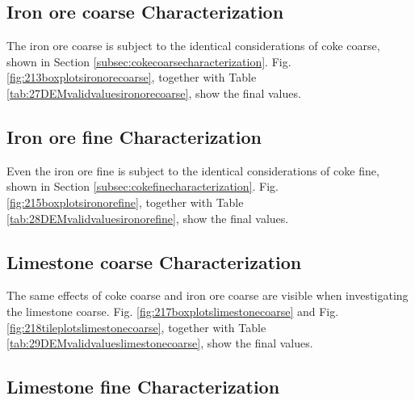 

%


\subsection{Iron ore coarse Characterization}
\label{subsec:ironorecoarsecharacterization}

The iron ore coarse is subject to the identical considerations of coke coarse,
shown in Section \ref{subsec:cokecoarsecharacterization}.
Fig. \ref{fig:213boxplotsironorecoarse}, together with Table
\ref{tab:27DEMvalidvaluesironorecoarse}, show the final values.



%


\subsection{Iron ore fine Characterization}
\label{subsec:ironorefinecharacterization}

Even the iron ore fine is subject to the identical considerations of coke
fine, shown in Section \ref{subsec:cokefinecharacterization}.
Fig. \ref{fig:215boxplotsironorefine}, together with Table
\ref{tab:28DEMvalidvaluesironorefine}, show the final values.



%


\subsection{Limestone coarse Characterization}
\label{subsec:limestonecoarsecharacterization}

The same effects of coke coarse and iron ore coarse are visible when
investigating the limestone coarse.
Fig. \ref{fig:217boxplotslimestonecoarse} and Fig.
\ref{fig:218tileplotslimestonecoarse}, together with Table
\ref{tab:29DEMvalidvalueslimestonecoarse}, show the final values.



%


\subsection{Limestone fine Characterization}
\label{subsec:limestonefinecharacterization}

